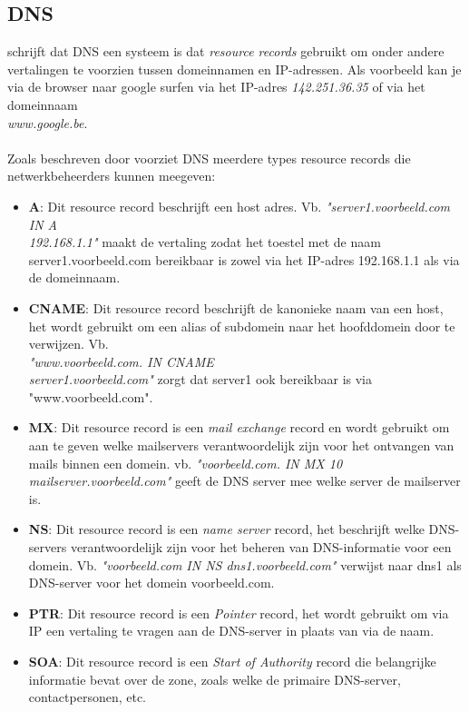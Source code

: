\documentclass{hogent-article}
\begin{document}
\subsection{DNS}
\textcite{Mockapetris1987} schrijft dat DNS een systeem is dat \textit{resource records} gebruikt om onder andere vertalingen te voorzien tussen domeinnamen en IP-adressen. Als voorbeeld kan je via de browser naar google surfen via het IP-adres \textit{142.251.36.35} of via het domeinnaam\\ \textit{www.google.be}.
\\ \\
Zoals beschreven door \textcite{Mockapetris1987} voorziet DNS meerdere types resource records die netwerkbeheerders kunnen meegeven: 
\begin{itemize}
    \item \textbf{A}: Dit resource record beschrijft een host adres. 
    Vb. \textit{"server1.voorbeeld.com IN A \\192.168.1.1"} maakt de vertaling zodat het toestel met de naam server1.voorbeeld.com bereikbaar is zowel via het IP-adres 192.168.1.1 als via de domeinnaam. 
    \item \textbf{CNAME}: Dit resource record beschrijft de kanonieke naam van een host, het wordt gebruikt om een alias of subdomein naar het hoofddomein door te verwijzen. Vb.\\ \textit{"www.voorbeeld.com. IN CNAME \\server1.voorbeeld.com"} zorgt dat server1 ook bereikbaar is via "www.voorbeeld.com".
    \item \textbf{MX}: Dit resource record is een \textit{mail exchange} record en wordt gebruikt om aan te geven welke mailservers verantwoordelijk zijn voor het ontvangen van mails binnen een domein. vb. \textit{"voorbeeld.com. IN MX 10 mailserver.voorbeeld.com"} geeft de DNS server mee welke server de mailserver is.
    \item \textbf{NS}: Dit resource record is een \textit{name server} record, het beschrijft welke DNS-servers verantwoordelijk zijn voor het beheren van DNS-informatie voor een domein. Vb. \textit{"voorbeeld.com IN NS dns1.voorbeeld.com"} verwijst naar dns1 als DNS-server voor het domein voorbeeld.com.
    \item \textbf{PTR}: Dit resource record is een \textit{Pointer} record, het wordt gebruikt om via IP een vertaling te vragen aan de DNS-server in plaats van via de naam.
    \item \textbf{SOA}: Dit resource record is een \textit{Start of Authority} record die belangrijke informatie bevat over de zone, zoals welke de primaire DNS-server, contactpersonen, etc.
\end{itemize}
\end{document}
